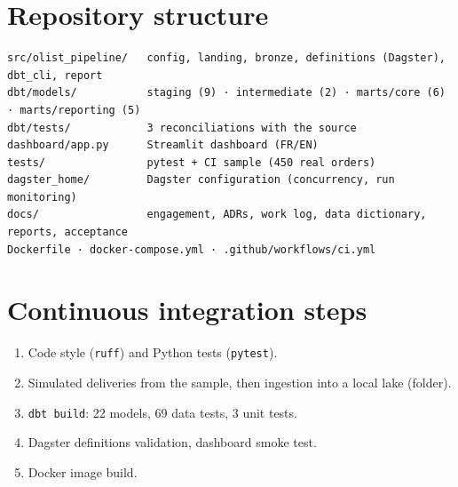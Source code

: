 \documentclass[11pt, a4paper, oneside, headings=normal, numbers=noenddot, DIV=12]{scrartcl}
\begin{document}
\clearpage
\appendix
\section{Repository structure}
\begin{lstlisting}[language={}]
src/olist_pipeline/   config, landing, bronze, definitions (Dagster), dbt_cli, report
dbt/models/           staging (9) · intermediate (2) · marts/core (6) · marts/reporting (5)
dbt/tests/            3 reconciliations with the source
dashboard/app.py      Streamlit dashboard (FR/EN)
tests/                pytest + CI sample (450 real orders)
dagster_home/         Dagster configuration (concurrency, run monitoring)
docs/                 engagement, ADRs, work log, data dictionary, reports, acceptance
Dockerfile · docker-compose.yml · .github/workflows/ci.yml
\end{lstlisting}

\section{Continuous integration steps}
\begin{enumerate}[leftmargin=1.4em]
  \item Code style (\texttt{ruff}) and Python tests (\texttt{pytest}).
  \item Simulated deliveries from the sample, then ingestion into a local lake (folder).
  \item \texttt{dbt build}: 22 models, 69 data tests, 3 unit tests.
  \item Dagster definitions validation, dashboard smoke test.
  \item Docker image build.
\end{enumerate}
\end{document}
